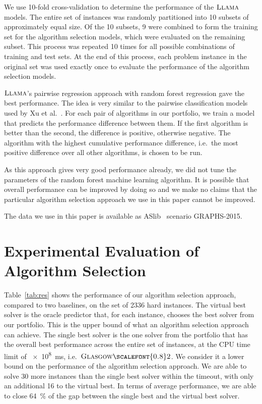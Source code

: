 \documentclass{llncs}
\newcommand{\GlasgowTwo}{$\textsc{Glasgow{\scalefont{0.8}2}}$\xspace}
\newcommand{\LLAMA}{$\textsc{Llama}$\xspace}
\begin{document}
We use 10-fold cross-validation to determine the performance of the \LLAMA models. The entire set of
instances was randomly partitioned into 10 subsets of approximately equal size. Of the 10 subsets, 9
were combined to form the training set for the algorithm selection models, which were evaluated on
the remaining subset. This process was repeated 10 times for all possible combinations of training
and test sets. At the end of this process, each problem instance in the original set was used
exactly once to evaluate the performance of the algorithm selection models.

\LLAMA's pairwise regression approach with random forest regression gave the best performance. The
idea is very similar to the pairwise classification models used by Xu et al.~\cite{xu_satzilla_2008}. For
each pair of algorithms in our portfolio, we train a model that predicts the performance difference
between them. If the first algorithm is better than the second, the difference is positive,
otherwise negative. The algorithm with the highest cumulative performance difference, i.e.\ the most
positive difference over all other algorithms, is chosen to be run.

As this approach gives very good performance already, we did not tune the parameters of the random
forest machine learning algorithm. It is possible that overall performance can be improved by doing
so and we make no claims that the particular algorithm selection approach we use in this paper
cannot be improved.

The data we use in this paper is available as ASlib~\cite{aslib} scenario GRAPHS-2015.

\section{Experimental Evaluation of Algorithm Selection}\label{sec:algsel-exps}

Table~\ref{tab:res} shows the performance of our algorithm selection approach,
compared to two baselines, on the set of 2336 hard instances. The virtual
best solver is the oracle predictor that, for each instance, chooses the best
solver from our portfolio. This is the upper bound of what an algorithm
selection approach can achieve. The single best solver is the one solver from
the portfolio that has the overall best performance across the entire set of
instances, at the CPU time limit of \SI{e8}{\ms}, i.e.\ \GlasgowTwo. We consider
it a lower bound on the performance of the algorithm selection approach.  We are
able to solve 30 more instances than the single best solver within the timeout,
with only an additional 16 to the virtual best. In terms of average performance,
we are able to close \SI{64}{\percent} of the gap between the single best and
the virtual best solver.
\end{document}
